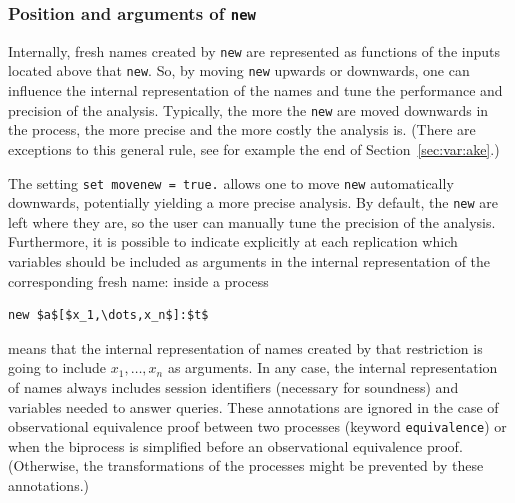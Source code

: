 \documentclass{book}
\begin{document}
\subsubsection{Position and arguments of \lstinline!new!}\label{sec:positionnew1}

Internally, fresh names created by \lstinline!new! are represented as
functions of the inputs located above that \lstinline!new!. So, by
moving \lstinline!new! upwards or downwards, one can influence the
internal representation of the names and tune the performance and
precision of the analysis. Typically, the more the \lstinline!new! are
moved downwards in the process, the more precise and the more costly
the analysis is. (There are exceptions to this general rule, see for
example the end of Section~\ref{sec:var:ake}.)

The setting \lstinline!set movenew = true.! allows one to move
\lstinline!new!  automatically downwards, potentially yielding a more
precise analysis. By default, the \lstinline!new! are left where they
are, so the user can manually tune the precision of the analysis.
Furthermore, it is possible to indicate explicitly at each replication
which variables should be included as arguments in the internal representation
of the corresponding fresh name: inside a process
\begin{lstlisting}[numbers=none]
new $a$[$x_1,\dots,x_n$]:$t$
\end{lstlisting}
means that the internal representation of names created by that restriction
is going to include $x_1,\dots,x_n$ as arguments.
%
In any case, the internal representation of names always includes
session identifiers (necessary for soundness) and variables needed
to answer queries. These annotations are ignored in the case of
observational equivalence proof between two processes (keyword
\lstinline!equivalence!) or when the biprocess is simplified before
an observational equivalence proof. (Otherwise, the transformations
of the processes might be prevented by these annotations.)
\end{document}
